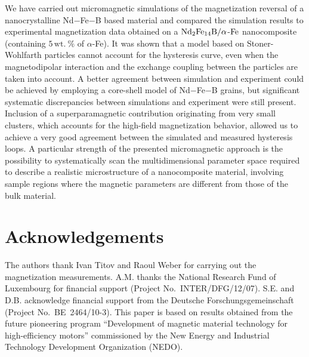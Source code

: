 \documentclass[prm,twocolumn,showkeys,preprintnumbers,amsmath,amssymb,superscriptaddress,aps,10pt]{revtex4-1}
\begin{document}
We have carried out micromagnetic simulations of the magnetization reversal of a nanocrystalline Nd$-$Fe$-$B based material and compared the simulation results to experimental magnetization data obtained on a $\rm{Nd}_2\rm{Fe}_{14}\rm{B}/\alpha$-$\rm{Fe}$ nanocomposite (containing $5 \, \mathrm{wt.~\%}$ of $\alpha$-Fe). It was shown that a model based on Stoner-Wohlfarth particles cannot account for the hysteresis curve, even when the magnetodipolar interaction and the exchange coupling between the particles are taken into account. A better agreement between simulation and experiment could be achieved by employing a core-shell model of Nd$-$Fe$-$B grains, but significant systematic discrepancies between simulations and experiment were still present. Inclusion of a superparamagnetic contribution originating from very small clusters, which accounts for the high-field magnetization behavior, allowed us to achieve a very good agreement between the simulated and measured hysteresis loops. A particular strength of the presented micromagnetic approach is the possibility to systematically scan the multidimensional parameter space required to describe a realistic microstructure of a nanocomposite material, involving sample regions where the magnetic parameters are different from those of the bulk material.

\section*{Acknowledgements}

The authors thank Ivan Titov and Raoul Weber for carrying out the magnetization measurements. A.M. thanks the National Research Fund of Luxembourg for financial support (Project No.~INTER/DFG/12/07). S.E. and D.B. acknowledge financial support from the Deutsche Forschungsgemeinschaft (Project No.~BE~2464/10-3). This paper is based on results obtained from the future pioneering program ``Development of magnetic material technology for high-efficiency motors'' commissioned by the New Energy and Industrial Technology Development Organization (NEDO).

%
\end{document}
